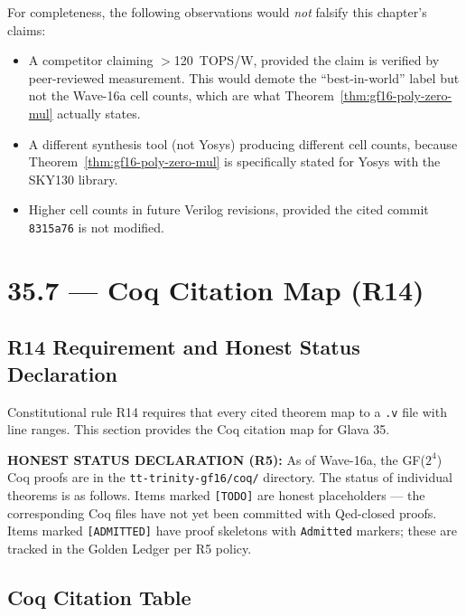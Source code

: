 For completeness, the following observations would \emph{not} falsify
this chapter's claims:
\begin{itemize}
  \item A competitor claiming $>$120~TOPS/W, provided the claim is verified
        by peer-reviewed measurement. This would demote the ``best-in-world''
        label but not the Wave-16a cell counts, which are what Theorem~\ref{thm:gf16-poly-zero-mul}
        actually states.
  \item A different synthesis tool (not Yosys) producing different cell counts,
        because Theorem~\ref{thm:gf16-poly-zero-mul} is specifically stated
        for Yosys with the SKY130 library.
  \item Higher cell counts in future Verilog revisions, provided the
        cited commit \texttt{8315a76} is not modified.
\end{itemize}

\section{35.7 --- Coq Citation Map (R14)}
\label{sec:glava35-coq-map}

\subsection{R14 Requirement and Honest Status Declaration}

Constitutional rule R14 requires that every cited theorem map to a
\texttt{.v} file with line ranges.
This section provides the Coq citation map for Glava 35.

\textbf{HONEST STATUS DECLARATION (R5):}
As of Wave-16a, the GF(\(2^4\)) Coq proofs are in the
\texttt{tt-trinity-gf16/coq/} directory.
The status of individual theorems is as follows.
Items marked \texttt{[TODO]} are honest placeholders --- the corresponding
Coq files have not yet been committed with Qed-closed proofs.
Items marked \texttt{[ADMITTED]} have proof skeletons with \texttt{Admitted}
markers; these are tracked in the Golden Ledger per R5 policy.

\subsection{Coq Citation Table}

